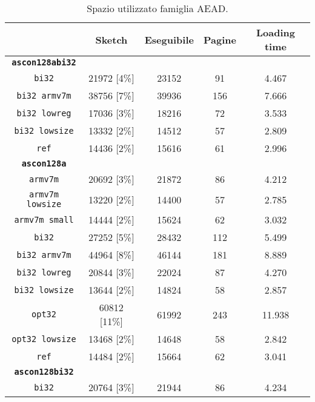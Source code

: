 \begin{table}[h]
    \caption{Spazio utilizzato famiglia AEAD.}
    \centering
    \begin{adjustbox}{width=300pt}
	\begin{tabular}{|c|c|c|c|c|}
		\hline
         & \textbf{Sketch} & \textbf{Eseguibile} & \textbf{Pagine} & \textbf{Loading time} \\
        \hline
        \texttt{\textbf{ascon128abi32}} & & & & \\
        \hline
        \texttt{bi32} & 21972 [4\%] & 23152 & 91 & 4.467 \\
        \hline
        \texttt{bi32 armv7m} & 38756 [7\%] & 39936 & 156 & 7.666 \\
        \hline
        \texttt{bi32 lowreg} & 17036 [3\%] & 18216 & 72 & 3.533 \\
        \hline
        \texttt{bi32 lowsize} & 13332 [2\%] & 14512 & 57 & 2.809 \\
        \hline
        \texttt{ref} & 14436 [2\%] & 15616 & 61 & 2.996 \\
        \hline
        \texttt{\textbf{ascon128a}} & & & & \\
        \hline
        \texttt{armv7m} & 20692 [3\%] & 21872 & 86 & 4.212 \\
        \hline
        \texttt{armv7m lowsize} & 13220 [2\%] & 14400 & 57 & 2.785 \\
        \hline
        \texttt{armv7m small} & 14444 [2\%] & 15624 & 62 & 3.032 \\
        \hline
        \texttt{bi32} & 27252 [5\%] & 28432 & 112 & 5.499 \\
        \hline
        \texttt{bi32 armv7m} & 44964 [8\%] & 46144 & 181 & 8.889 \\
        \hline
        \texttt{bi32 lowreg} & 20844 [3\%] & 22024 & 87 & 4.270 \\
        \hline
        \texttt{bi32 lowsize} & 13644 [2\%] & 14824 & 58 & 2.857 \\
        \hline
        \texttt{opt32} & 60812 [11\%] & 61992 & 243 & 11.938 \\
        \hline
        \texttt{opt32 lowsize} & 13468 [2\%] & 14648 & 58 & 2.842 \\
        \hline
        \texttt{ref} & 14484 [2\%] & 15664 & 62 & 3.041 \\
        \hline
        \texttt{\textbf{ascon128bi32}} & & & & \\
        \hline
        \texttt{bi32} & 20764 [3\%] & 21944 & 86 & 4.234 \\

\end{tabular}
\end{adjustbox}
\end{table}
